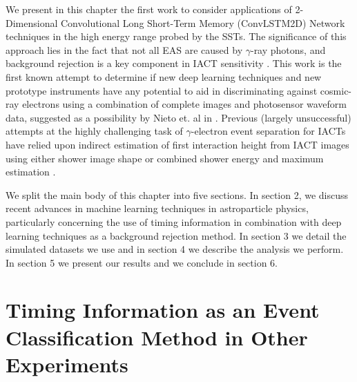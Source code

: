 We present in this chapter the first work to consider applications of 2-Dimensional Convolutional Long Short-Term Memory (ConvLSTM2D) Network techniques in the high energy range probed by the SSTs. The significance of this approach lies in the fact that not all EAS are caused by $\gamma$-ray photons, and background rejection is a key component in IACT sensitivity \cite{Shilon}. This work is the first known attempt to determine if new deep learning techniques and new prototype instruments have any potential to aid in discriminating against cosmic-ray electrons using a combination of complete images and photosensor waveform data, suggested as a possibility by Nieto et. al in \cite{nieto2017exploring}. Previous (largely unsuccessful) attempts at the highly challenging task of $\gamma$-electron event separation for IACTs have relied upon indirect estimation of first interaction height from IACT images using either shower image shape or combined shower energy and maximum estimation \cite{Sitarek1i}.

We split the main body of this chapter into five sections. In section 2, we discuss recent advances in machine learning techniques in astroparticle physics, particularly concerning the use of timing information in combination with deep learning techniques as a background rejection method. In section 3 we detail the simulated datasets we use and in section 4 we describe the analysis we perform. In section 5 we present our results and we conclude in section 6. 

\section{Timing Information as an Event Classification Method in Other Experiments} \label{RelatedWork}
